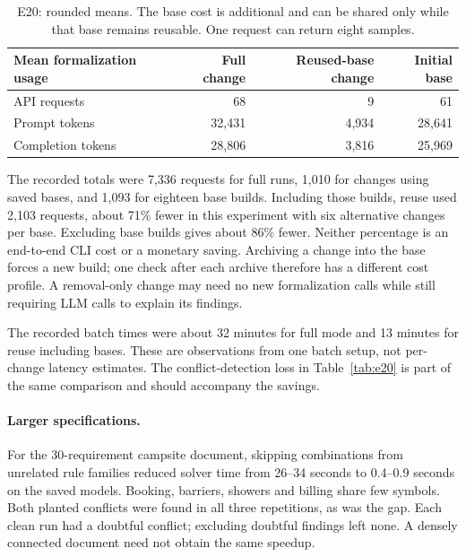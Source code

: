 \begin{table}[H]
\centering
\small
\begin{tabularx}{\linewidth}{@{}Xrrr@{}}
\toprule
Mean formalization usage & Full change & Reused-base change & Initial base \\
\midrule
API requests & 68 & 9 & 61 \\
Prompt tokens & 32,431 & 4,934 & 28,641 \\
Completion tokens & 28,806 & 3,816 & 25,969 \\
\bottomrule
\end{tabularx}
\caption{E20: rounded means. The base cost is additional and can be shared only while that base remains reusable. One request can return eight samples.}
\label{tab:reuse-cost}
\end{table}

The recorded totals were 7,336 requests for full runs, 1,010 for changes using saved bases, and 1,093 for eighteen base builds. Including those builds, reuse used 2,103 requests, about 71\% fewer in this experiment with six alternative changes per base. Excluding base builds gives about 86\% fewer. Neither percentage is an end-to-end CLI cost or a monetary saving. Archiving a change into the base forces a new build; one check after each archive therefore has a different cost profile. A removal-only change may need no new formalization calls while still requiring LLM calls to explain its findings.

The recorded batch times were about 32 minutes for full mode and 13 minutes for reuse including bases. These are observations from one batch setup, not per-change latency estimates. The conflict-detection loss in Table~\ref{tab:e20} is part of the same comparison and should accompany the savings.

\paragraph{Larger specifications.}

For the 30-requirement campsite document, skipping combinations from unrelated
rule families reduced solver time from 26--34 seconds to 0.4--0.9 seconds on
the saved models. Booking, barriers, showers and billing share few symbols.
Both planted conflicts were found in all three repetitions, as was the gap.
Each clean run had a doubtful conflict; excluding doubtful findings left none.
A densely connected document need not obtain the same speedup.

